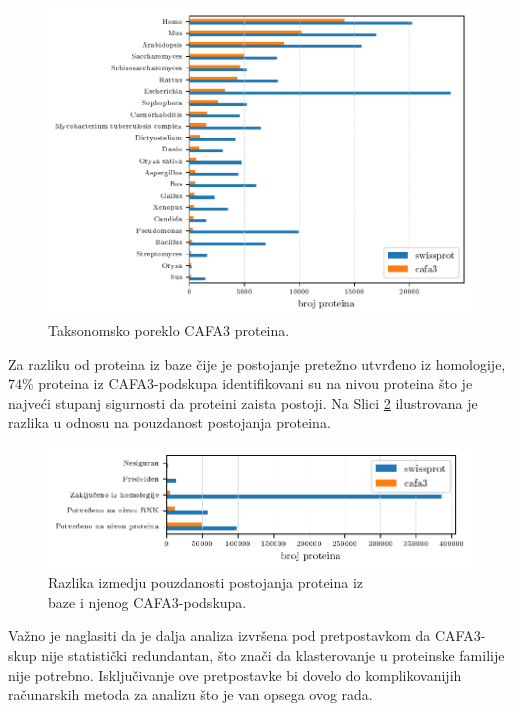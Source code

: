 \begin{figure}[th]
\centering
\hspace*{-3.0cm} 
\includegraphics[]{plots/sp_vs_cafa3}
\caption{Taksonomsko poreklo CAFA3 proteina. \\ \footnotesize 
}
\label{fig:sp_vs_cafa3}
\end{figure}

Za razliku od proteina iz baze \swissprot čije je postojanje pretežno utvrđeno
iz homologije, $74\%$ proteina iz CAFA3-podskupa identifikovani su na 
nivou proteina što je najveći stupanj sigurnosti da proteini zaista postoji. Na
Slici \ref{fig:cafa3_pe} ilustrovana je razlika u odnosu na pouzdanost
postojanja proteina. 



\begin{figure}[th]
\centering
\hspace*{-.1cm} 
\includegraphics[]{plots/cafa3_pe}
\caption{Razlika izmedju pouzdanosti postojanja proteina iz \\ baze \swissprot i njenog CAFA3-podskupa. }
\label{fig:cafa3_pe}
\end{figure}


Važno je naglasiti da je dalja analiza izvršena pod pretpostavkom da CAFA3-skup
nije statistički redundantan, što znači da klasterovanje u proteinske familije
nije potrebno.  Isključivanje ove pretpostavke bi dovelo do komplikovanijih
računarskih metoda za analizu što je van opsega ovog rada.



